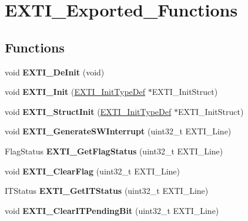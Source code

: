 \hypertarget{group__EXTI__Exported__Functions}{
\section{EXTI\_\-Exported\_\-Functions}
\label{group__EXTI__Exported__Functions}
}
\subsection*{Functions}
\begin{DoxyCompactItemize}
\item 
\hypertarget{group__EXTI__Exported__Functions_ga07072e339cb9ecb9cd9d4b94afc9f317}{
void {\bfseries EXTI\_\-DeInit} (void)}
\label{group__EXTI__Exported__Functions_ga07072e339cb9ecb9cd9d4b94afc9f317}

\item 
\hypertarget{group__EXTI__Exported__Functions_ga8c9ce6352a3a2dfc8fc9287cb24c6501}{
void {\bfseries EXTI\_\-Init} (\hyperlink{structEXTI__InitTypeDef}{EXTI\_\-InitTypeDef} $\ast$EXTI\_\-InitStruct)}
\label{group__EXTI__Exported__Functions_ga8c9ce6352a3a2dfc8fc9287cb24c6501}

\item 
\hypertarget{group__EXTI__Exported__Functions_ga86b9e662d18a2f829999cfb26aa7ca20}{
void {\bfseries EXTI\_\-StructInit} (\hyperlink{structEXTI__InitTypeDef}{EXTI\_\-InitTypeDef} $\ast$EXTI\_\-InitStruct)}
\label{group__EXTI__Exported__Functions_ga86b9e662d18a2f829999cfb26aa7ca20}

\item 
\hypertarget{group__EXTI__Exported__Functions_ga897e8ea59f40a19e047fb9994876fc9b}{
void {\bfseries EXTI\_\-GenerateSWInterrupt} (uint32\_\-t EXTI\_\-Line)}
\label{group__EXTI__Exported__Functions_ga897e8ea59f40a19e047fb9994876fc9b}

\item 
\hypertarget{group__EXTI__Exported__Functions_ga0ce06e6b312592df149800d63218cffa}{
FlagStatus {\bfseries EXTI\_\-GetFlagStatus} (uint32\_\-t EXTI\_\-Line)}
\label{group__EXTI__Exported__Functions_ga0ce06e6b312592df149800d63218cffa}

\item 
\hypertarget{group__EXTI__Exported__Functions_ga8e07aaaa286dea4803605d5968850a92}{
void {\bfseries EXTI\_\-ClearFlag} (uint32\_\-t EXTI\_\-Line)}
\label{group__EXTI__Exported__Functions_ga8e07aaaa286dea4803605d5968850a92}

\item 
\hypertarget{group__EXTI__Exported__Functions_gaf7b51519062ae42fd27ee689cab364aa}{
ITStatus {\bfseries EXTI\_\-GetITStatus} (uint32\_\-t EXTI\_\-Line)}
\label{group__EXTI__Exported__Functions_gaf7b51519062ae42fd27ee689cab364aa}

\item 
\hypertarget{group__EXTI__Exported__Functions_ga3652a7e682728b310c124e7e974d1468}{
void {\bfseries EXTI\_\-ClearITPendingBit} (uint32\_\-t EXTI\_\-Line)}
\label{group__EXTI__Exported__Functions_ga3652a7e682728b310c124e7e974d1468}

\end{DoxyCompactItemize}
